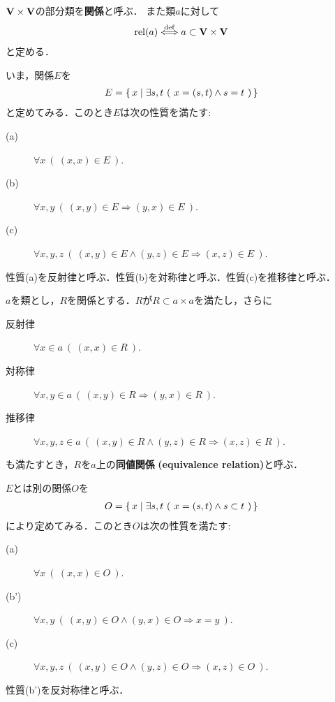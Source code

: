 	\begin{screen}
		\begin{dfn}[関係]
			$\mathbf{V} \times \mathbf{V}$の部分類を{\bf 関係}と呼ぶ．
			また類$a$に対して
			\begin{align}
				\operatorname*{rel} (a) \overset{\mathrm{def}}{\Longleftrightarrow} a \subset \mathbf{V} \times \mathbf{V}
			\end{align}
			と定める．
		\end{dfn}
	\end{screen}
	
	いま，関係$E$を
	\begin{align}
		E = \left\{\, x \mid \exists s,t\ (\ x=(s,t) \wedge s = t\ )\, \right\}
	\end{align}
	と定めてみる．このとき$E$は次の性質を満たす:
	\begin{description}
		\item[(a)] $\forall x\ (\ (x,x) \in E\ )$.
		\item[(b)] $\forall x,y\ (\ (x,y) \in E \Longrightarrow (y,x) \in E\ )$.
		\item[(c)] $\forall x,y,z\ (\ (x,y) \in E \wedge (y,z) \in E \Longrightarrow (x,z) \in E\ )$.
	\end{description}
	性質(a)を反射律と呼ぶ．性質(b)を対称律と呼ぶ．性質(c)を推移律と呼ぶ．
	
	\begin{screen}
		\begin{dfn}[同値関係]
			$a$を類とし，$R$を関係とする．$R$が$R \subset a \times a$を満たし，さらに
			\begin{description}
				\item[反射律] $\forall x \in a\ (\ (x,x) \in R\ )$.
				\item[対称律] $\forall x,y \in a\ (\ (x,y) \in R \Longrightarrow (y,x) \in R\ )$.
				\item[推移律] $\forall x,y,z \in a\ (\ (x,y) \in R \wedge (y,z) \in R \Longrightarrow (x,z) \in R\ )$.
			\end{description}
			も満たすとき，$R$を$a$上の{\bf 同値関係}\index{どうちかんけい@同値関係}
			{\bf (equivalence relation)}と呼ぶ．
		\end{dfn}
	\end{screen}
	
	
	$E$とは別の関係$O$を
	\begin{align}
		O = \left\{\, x \mid \exists s,t\ (\ x=(s,t) \wedge s \subset t\ )\, \right\}
	\end{align}
	により定めてみる．このとき$O$は次の性質を満たす:
	\begin{description}
		\item[(a)] $\forall x\ (\ (x,x) \in O\ )$.
		\item[(b')] $\forall x,y\ (\ (x,y) \in O \wedge (y,x) \in O \Longrightarrow x=y\ )$.
		\item[(c)] $\forall x,y,z\ (\ (x,y) \in O \wedge (y,z) \in O \Longrightarrow (x,z) \in O\ )$.
	\end{description}
	性質(b')を反対称律と呼ぶ．
	
